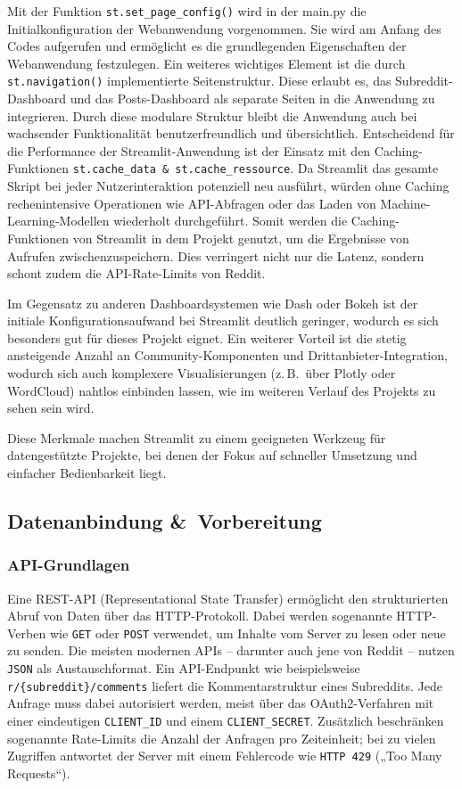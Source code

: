 Mit der Funktion \verb|st.set_page_config()| wird in der main.py die Initialkonfiguration der Webanwendung vorgenommen. Sie wird am Anfang des Codes aufgerufen und ermöglicht es die grundlegenden Eigenschaften der Webanwendung festzulegen.
Ein weiteres wichtiges Element ist die durch \verb|st.navigation()| implementierte Seitenstruktur. Diese erlaubt es, das Subreddit-Dashboard und das Posts-Dashboard als separate Seiten in die Anwendung zu integrieren. Durch diese modulare Struktur bleibt die Anwendung auch bei wachsender Funktionalität benutzerfreundlich und übersichtlich.
Entscheidend für die Performance der Streamlit-Anwendung ist der Einsatz mit den Caching-Funktionen \verb|st.cache_data & st.cache_ressource|. Da Streamlit das gesamte Skript bei jeder Nutzerinteraktion potenziell neu ausführt, würden ohne Caching rechenintensive Operationen wie API-Abfragen oder das Laden von Machine-Learning-Modellen wiederholt durchgeführt. Somit werden die Caching-Funktionen von Streamlit in dem Projekt genutzt, um die Ergebnisse von Aufrufen zwischenzuspeichern. Dies verringert nicht nur die Latenz, sondern schont zudem die API-Rate-Limits von Reddit.

Im Gegensatz zu anderen Dashboardsystemen wie Dash oder Bokeh ist der initiale Konfigurationsaufwand bei Streamlit deutlich geringer, wodurch es sich besonders gut für dieses Projekt eignet. 
Ein weiterer Vorteil ist die stetig ansteigende Anzahl an Community-Komponenten und Drittanbieter-Integration, wodurch sich auch komplexere Visualisierungen (z.\,B.\ über Plotly oder WordCloud) nahtlos einbinden lassen, wie im weiteren Verlauf des Projekts zu sehen sein wird. 

Diese Merkmale machen Streamlit zu einem geeigneten Werkzeug für datengestützte Projekte, bei denen der Fokus auf schneller Umsetzung und einfacher Bedienbarkeit liegt.


\subsection{Datenanbindung \&~Vorbereitung}

\subsubsection{API-Grundlagen}
Eine REST-API (Representational State Transfer) ermöglicht
den strukturierten Abruf von Daten über das HTTP-Protokoll.
Dabei werden sogenannte HTTP-Verben wie \texttt{GET} oder \texttt{POST} verwendet, um Inhalte vom Server zu lesen oder neue zu senden.
Die meisten modernen APIs – darunter auch jene von Reddit – nutzen \texttt{JSON} als Austauschformat.
Ein API-Endpunkt wie beispielsweise \texttt{r/\{subreddit\}/comments} liefert die Kommentarstruktur eines Subreddits.
Jede Anfrage muss dabei autorisiert werden, meist über das OAuth2-Verfahren mit einer eindeutigen \texttt{CLIENT\_ID} und einem \texttt{CLIENT\_SECRET}.
Zusätzlich beschränken sogenannte Rate-Limits die Anzahl der Anfragen pro Zeiteinheit; bei zu vielen Zugriffen antwortet der Server mit einem Fehlercode wie \texttt{HTTP 429} („Too Many Requests“).

